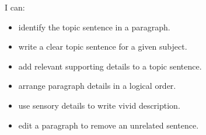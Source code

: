 \begin{selfcheck}
I can:
\begin{itemize}
    \item identify the topic sentence in a paragraph.
    \item write a clear topic sentence for a given subject.
    \item add relevant supporting details to a topic sentence.
    \item arrange paragraph details in a logical order.
    \item use sensory details to write vivid description.
    \item edit a paragraph to remove an unrelated sentence.
\end{itemize}
\end{selfcheck}